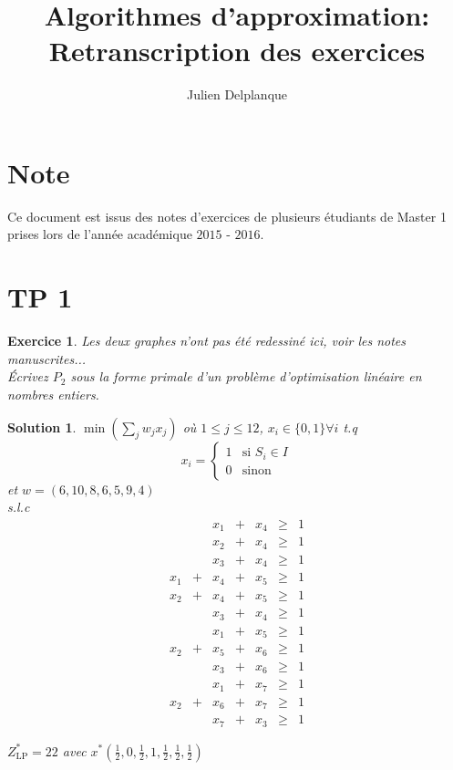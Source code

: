 \documentclass[a4paper,11pt]{report}
\title{Algorithmes d'approximation: Retranscription des exercices}
\author{Julien Delplanque}
\newtheorem{exercice}{Exercice}
\newtheorem{solution}{Solution}
\begin{document}
\maketitle
\newpage

\section{Note}
Ce document est issus des notes d'exercices de plusieurs étudiants de Master 1
prises lors de l'année académique $2015$ - $2016$.

\section{TP 1}
\begin{exercice}
Les deux graphes n'ont pas été redessiné ici, voir les notes manuscrites...\\

\noindent Écrivez $P_2$ sous la forme primale d'un problème d'optimisation
linéaire en nombres entiers.
\end{exercice}

\begin{solution}
$\min(\sum\limits_j{w_jx_j})$ où $1 \le j \le 12$, $x_i \in \{0,1\} \forall i$
t.q
$$
x_i =
\begin{cases}
1 & \text{si } S_i \in I\\
0 & \text{sinon}
\end{cases}
$$
et $w=(6,10,8,6,5,9,4)$\\
s.l.c\\
$$
\begin{array}{ccccccc}
    &   & x_1 & + & x_4 & \ge & 1\\
    &   & x_2 & + & x_4 & \ge & 1\\
    &   & x_3 & + & x_4 & \ge & 1\\
x_1 & + & x_4 & + & x_5 & \ge & 1\\
x_2 & + & x_4 & + & x_5 & \ge & 1\\
    &   & x_3 & + & x_4 & \ge & 1\\
    &   & x_1 & + & x_5 & \ge & 1\\
x_2 & + & x_5 & + & x_6 & \ge & 1\\
    &   & x_3 & + & x_6 & \ge & 1\\
    &   & x_1 & + & x_7 & \ge & 1\\
x_2 & + & x_6 & + & x_7 & \ge & 1\\
    &   & x_7 & + & x_3 & \ge & 1
\end{array}
$$

$Z_{\text{LP}}^* = 22$ avec
$x^*(\frac{1}{2},0,\frac{1}{2},1,\frac{1}{2},\frac{1}{2},\frac{1}{2})$
\end{solution}
\end{document}

